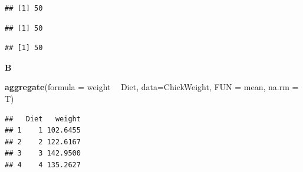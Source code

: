 \documentclass[]{book}
\newenvironment{Shaded}{\begin{snugshade}}{\end{snugshade}}
\newcommand{\CommentTok}[1]{\textcolor[rgb]{0.56,0.35,0.01}{\textit{#1}}}
\newcommand{\ControlFlowTok}[1]{\textcolor[rgb]{0.13,0.29,0.53}{\textbf{#1}}}
\newcommand{\DataTypeTok}[1]{\textcolor[rgb]{0.13,0.29,0.53}{#1}}
\newcommand{\KeywordTok}[1]{\textcolor[rgb]{0.13,0.29,0.53}{\textbf{#1}}}
\newcommand{\NormalTok}[1]{#1}
\newcommand{\OperatorTok}[1]{\textcolor[rgb]{0.81,0.36,0.00}{\textbf{#1}}}
\newcommand{\StringTok}[1]{\textcolor[rgb]{0.31,0.60,0.02}{#1}}
\begin{document}
\begin{verbatim}
## [1] 50
\end{verbatim}

\begin{Shaded}
\end{Shaded}

\begin{verbatim}
## [1] 50
\end{verbatim}

\begin{Shaded}
\end{Shaded}

\begin{verbatim}
## [1] 50
\end{verbatim}

\textbf{B}

\begin{Shaded}
\begin{Highlighting}[]
\KeywordTok{aggregate}\NormalTok{(}\DataTypeTok{formula =}\NormalTok{ weight }\OperatorTok{~}\StringTok{ }\NormalTok{Diet, }\DataTypeTok{data=}\NormalTok{ChickWeight, }\DataTypeTok{FUN =}\NormalTok{ mean, }\DataTypeTok{na.rm =}\NormalTok{ T)}
\end{Highlighting}
\end{Shaded}

\begin{verbatim}
##   Diet   weight
## 1    1 102.6455
## 2    2 122.6167
## 3    3 142.9500
## 4    4 135.2627
\end{verbatim}

\begin{Shaded}
\end{Shaded}
\end{document}
